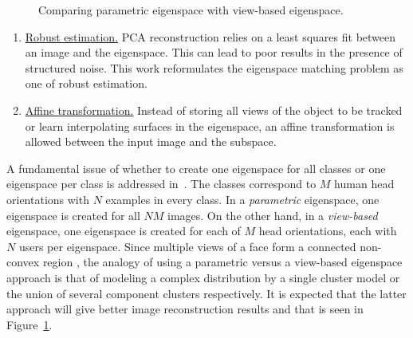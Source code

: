 \begin{figure}[t]
\centering	
{}
\caption{Comparing parametric eigenspace with view-based eigenspace.}								
\label{fig:parametric_vs_viewBased_eigenspace}				
\end{figure}

\begin{enumerate}
\item \underline{Robust estimation.}  PCA reconstruction relies on a least squares fit between an image and the eigenspace.  This can lead to poor results in the presence of structured noise.  This work reformulates the eigenspace matching problem as one of robust estimation.
\item \underline{Affine transformation.} Instead of storing all views of the object to be tracked or learn interpolating surfaces in the eigenspace, an affine transformation is allowed between the input image and the subspace.
\end{enumerate}

A fundamental issue of whether to create one eigenspace for all classes or one eigenspace per class is addressed in~\cite{1997_JNL_EigenTRK_Moghaddam}.  The classes correspond to $M$ human head orientations with $N$ examples in every class.  In a \emph{parametric} eigenspace, one eigenspace is created for all $NM$ images.  On the other hand, in a \emph{view-based} eigenspace, one eigenspace is created for each of $M$ head orientations, each with $N$ users per eigenspace.  Since multiple views of a face form a connected non-convex region \cite{1994_JNL_FaceTop_Bichsel}, the analogy of using a parametric versus a view-based eigenspace approach is that of modeling a complex distribution by a single cluster model or the union of several component clusters respectively.  It is expected that the latter approach will give better image reconstruction results and that is seen in Figure~\ref{fig:parametric_vs_viewBased_eigenspace}.  

